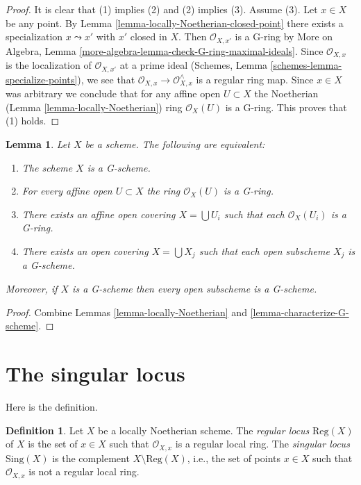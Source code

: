 \documentclass{stacks-project}
\theoremstyle{plain}
\newtheorem{lemma}[subsection]{Lemma}
\theoremstyle{definition}
\newtheorem{definition}[subsection]{Definition}
\theoremstyle{remark}
\numberwithin{equation}{subsection}
\begin{document}
\begin{proof}
It is clear that (1) implies (2) and (2) implies (3).
Assume (3). Let $x \in X$ be any point. By
Lemma \ref{lemma-locally-Noetherian-closed-point}
there exists a specialization $x \leadsto x'$ with $x'$ closed
in $X$. Then $\mathcal{O}_{X, x'}$ is a G-ring by
More on Algebra, Lemma \ref{more-algebra-lemma-check-G-ring-maximal-ideals}.
Since $\mathcal{O}_{X, x}$ is the localization of $\mathcal{O}_{X, x'}$
at a prime ideal (Schemes, Lemma \ref{schemes-lemma-specialize-points}),
we see that $\mathcal{O}_{X, x} \to \mathcal{O}_{X, x}^\wedge$
is a regular ring map. Since $x \in X$ was arbitrary we conclude
that for any affine open $U \subset X$ the Noetherian
(Lemma \ref{lemma-locally-Noetherian}) ring $\mathcal{O}_X(U)$ is a G-ring.
This proves that (1) holds.
\end{proof}

\begin{lemma}
\label{lemma-locally-G-scheme}
Let $X$ be a scheme. The following are equivalent:
\begin{enumerate}
\item The scheme $X$ is a G-scheme.
\item For every affine open $U \subset X$ the ring $\mathcal{O}_X(U)$
is a G-ring.
\item There exists an affine open covering $X = \bigcup U_i$ such that
each $\mathcal{O}_X(U_i)$ is a G-ring.
\item There exists an open covering $X = \bigcup X_j$
such that each open subscheme $X_j$ is a G-scheme.
\end{enumerate}
Moreover, if $X$ is a G-scheme then every open subscheme is a
G-scheme.
\end{lemma}

\begin{proof}
Combine Lemmas \ref{lemma-locally-Noetherian}
and \ref{lemma-characterize-G-scheme}.
\end{proof}




\section{The singular locus}
\label{section-singular-locus}

\noindent
Here is the definition.

\begin{definition}
\label{definition-singular-locus}
Let $X$ be a locally Noetherian scheme. The {\it regular locus}
$\text{Reg}(X)$ of $X$ is the set of $x \in X$ such that $\mathcal{O}_{X, x}$
is a regular local ring. The {\it singular locus} $\text{Sing}(X)$ is the
complement $X \setminus \text{Reg}(X)$, i.e., the set of points $x \in X$
such that $\mathcal{O}_{X, x}$ is not a regular local ring.
\end{definition}
\end{document}
